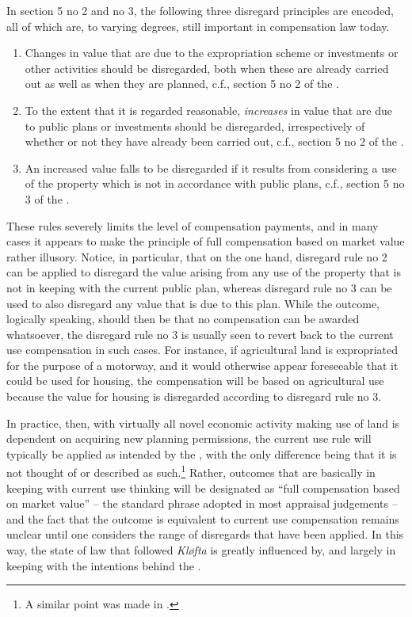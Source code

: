 In section 5 no 2 and no 3, the following three disregard principles are encoded, all of which are, to varying degrees, still important in compensation law today.

\begin{enumerate}
\item Changes in value that are due to the expropriation scheme or investments or other activities should be disregarded, both when these are already carried out as well as when they are planned, c.f., section 5 no 2 of the \cite{ca73}.
\item To the extent that it is regarded reasonable, \emph{increases} in value that are due to public plans or investments should be disregarded, irrespectively of whether or not they have already been carried out, c.f., section 5 no 2 of the \cite{ca73}.
\item An increased value falls to be disregarded if it results from considering a use of the property which is not in accordance with public plans, c.f., section 5 no 3 of the \cite{ca73}.
\end{enumerate}

These rules severely limits the level of compensation payments, and in many cases it appears to make the principle of full compensation based on market value rather illusory. Notice, in particular, that on the one hand, disregard rule no 2 can be applied to disregard the value arising from any use of the property that is not in keeping with the current public plan, whereas disregard rule no 3 can be used to also disregard any value that is due to this plan. While the outcome, logically speaking, should then be that no compensation can be awarded whatsoever, the disregard rule no 3 is usually seen to revert back to the current use compensation in such cases. For instance, if agricultural land is expropriated for the purpose of a motorway, and it would otherwise appear foreseeable that it could be used for housing, the compensation will be based on agricultural use because the value for housing is disregarded according to disregard rule no 3.

In practice, then, with virtually all novel economic activity making use of land is dependent on acquiring new planning permissions, the current use rule will typically be applied as intended by the \cite{ca73}, with the only difference being that it is not thought of or described as such.\footnote{A similar point was made in \cite{stordrange94}.} Rather, outcomes that are basically in keeping with current use thinking will be designated as ``full compensation based on market value'' -- the standard phrase adopted in most appraisal judgements -- and the fact that the outcome is equivalent to current use compensation remains unclear until one considers the range of disregards that have been applied. In this way, the state of law that followed \emph{Kløfta} is greatly influenced by, and largely in keeping with the intentions behind the \cite{ca73}.

